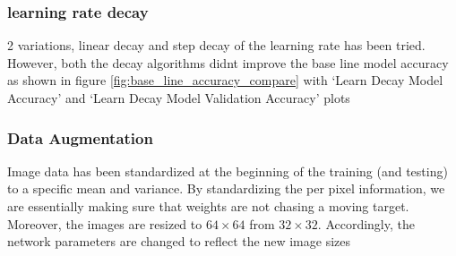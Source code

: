 \documentclass[conference]{IEEEtran}
\begin{document}
		\subsubsection{learning rate decay}
		2 variations, linear decay and step decay of the learning rate has been tried. However, both the decay algorithms didnt improve the base line model accuracy as shown in figure \ref{fig:base_line_accuracy_compare} with `Learn Decay Model Accuracy' and `Learn Decay Model Validation Accuracy' plots
		\subsubsection{Data Augmentation}
		Image data has been standardized at the beginning of the training (and testing) to a specific mean and variance. By standardizing the per pixel information, we are essentially making sure that weights are not chasing a moving target. Moreover, the images are resized to $64 \times 64$ from $32 \times 32$. Accordingly, the network parameters are changed to reflect the new image sizes
\end{document}
